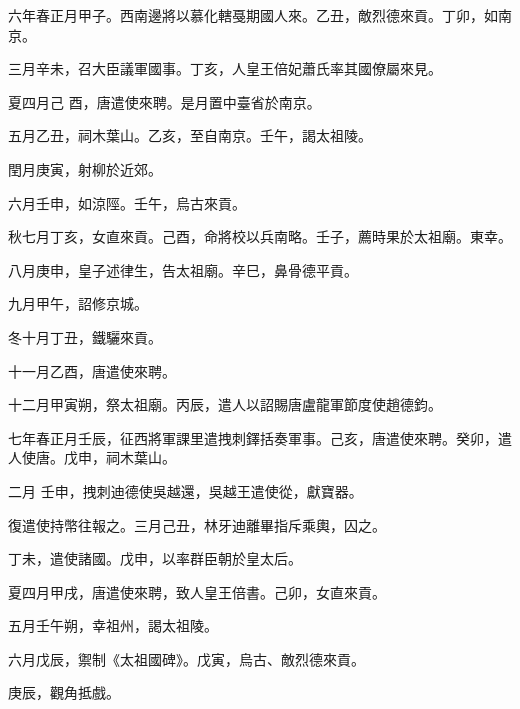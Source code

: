 \begin{pinyinscope}
 六年春正月甲子。西南邊將以慕化轄戞期國人來。乙丑，敵烈德來貢。丁卯，如南京。



 三月辛未，召大臣議軍國事。丁亥，人皇王倍妃蕭氏率其國僚屬來見。



 夏四月己
 酉，唐遣使來聘。是月置中臺省於南京。



 五月乙丑，祠木葉山。乙亥，至自南京。壬午，謁太祖陵。



 閏月庚寅，射柳於近郊。



 六月壬申，如涼陘。壬午，烏古來貢。



 秋七月丁亥，女直來貢。己酉，命將校以兵南略。壬子，薦時果於太祖廟。東幸。



 八月庚申，皇子述律生，告太祖廟。辛巳，鼻骨德平貢。



 九月甲午，詔修京城。



 冬十月丁丑，鐵驪來貢。



 十一月乙酉，唐遣使來聘。



 十二月甲寅朔，祭太祖廟。丙辰，遣人以詔賜唐盧龍軍節度使趙德鈞。



 七年春正月壬辰，征西將軍課里遣拽刺鐸括奏軍事。己亥，唐遣使來聘。癸卯，遣人使唐。戊申，祠木葉山。



 二月
 壬申，拽刺迪德使吳越還，吳越王遣使從，獻寶器。



 復遣使持幣往報之。三月己丑，林牙迪離畢指斥乘輿，囚之。



 丁未，遣使諸國。戊申，以率群臣朝於皇太后。



 夏四月甲戌，唐遣使來聘，致人皇王倍書。己卯，女直來貢。



 五月壬午朔，幸祖州，謁太祖陵。



 六月戊辰，禦制《太祖國碑》。戊寅，烏古、敵烈德來貢。



 庚辰，觀角抵戲。




\end{pinyinscope}
